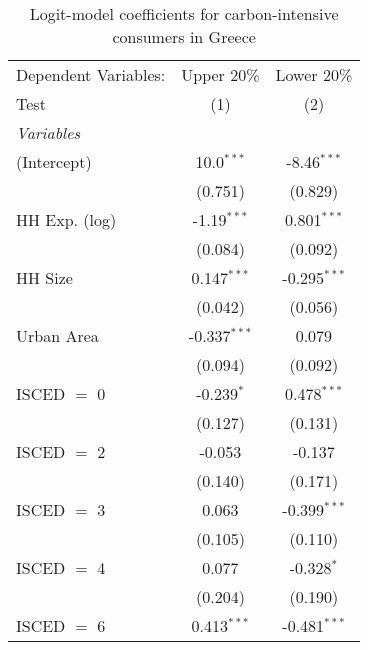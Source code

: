 
\begin{table}[htbp!]
   \centering
   \small
   \begin{adjustbox}{width = 1\textwidth, max height = 0.95\textheight, center}
      \begin{threeparttable}[b]
         \caption{\label{tab:Logit_1_GRC} Logit-model coefficients for carbon-intensive consumers in Greece}
         \begin{tabular}{lcc}
            \tabularnewline \midrule \midrule
            Dependent Variables: & Upper 20\%     & Lower 20\%\\   
            Test                 & (1)            & (2)\\  
            \midrule
            \emph{Variables}\\
            (Intercept)          & 10.0$^{***}$   & -8.46$^{***}$\\   
                                 & (0.751)        & (0.829)\\   
            HH Exp. (log)        & -1.19$^{***}$  & 0.801$^{***}$\\   
                                 & (0.084)        & (0.092)\\   
            HH Size              & 0.147$^{***}$  & -0.295$^{***}$\\   
                                 & (0.042)        & (0.056)\\   
            Urban Area           & -0.337$^{***}$ & 0.079\\   
                                 & (0.094)        & (0.092)\\   
            ISCED $=$ 0          & -0.239$^{*}$   & 0.478$^{***}$\\   
                                 & (0.127)        & (0.131)\\   
            ISCED $=$ 2          & -0.053         & -0.137\\   
                                 & (0.140)        & (0.171)\\   
            ISCED $=$ 3          & 0.063          & -0.399$^{***}$\\   
                                 & (0.105)        & (0.110)\\   
            ISCED $=$ 4          & 0.077          & -0.328$^{*}$\\   
                                 & (0.204)        & (0.190)\\   
            ISCED $=$ 6          & 0.413$^{***}$  & -0.481$^{***}$\\   

\end{tabular}
\end{threeparttable}
\end{adjustbox}
\end{table}
